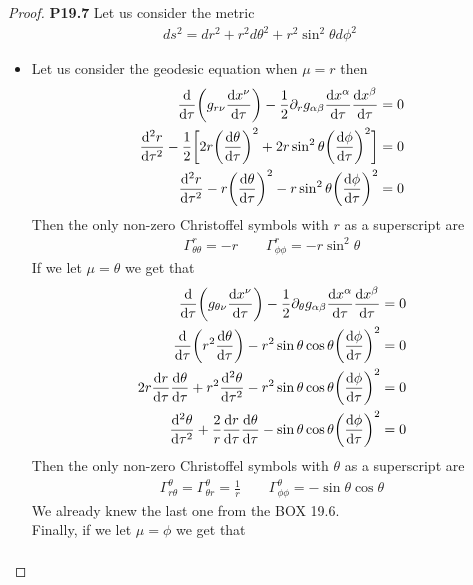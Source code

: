 \documentclass[11pt]{article}
\theoremstyle{definition}
\begin{document}
\cleardoublepage
\begin{proof}{\textbf{P19.7}}
Let us consider the metric
\begin{align*}
    ds^2 = dr^2 + r^2d\theta^2 + r^2\sin^2\theta d\phi^2
\end{align*}
\begin{itemize}
\item [\textbf{a.}] Let us consider the geodesic equation when $\mu = r$ then
\begin{align*}
    \dv{\tau}(g_{r\nu}\dv{x^{\nu}}{\tau})
    - \frac{1}{2}\partial_{r}g_{\alpha\beta}\dv{x^\alpha}{\tau}\dv{x^\beta}{\tau}
    &= 0\\
    \dv[2]{r}{\tau}
    - \frac{1}{2}\bigg[
        2r\bigg(\dv{\theta}{\tau}\bigg)^2
        + 2r\sin^2\theta\bigg(\dv{\phi}{\tau}\bigg)^2
    \bigg]
    &= 0\\
    \dv[2]{r}{\tau}
    - r\bigg(\dv{\theta}{\tau}\bigg)^2
    - r\sin^2\theta\bigg(\dv{\phi}{\tau}\bigg)^2
    &= 0
\end{align*}
Then the only non-zero Christoffel symbols with $r$ as a superscript are
\begin{align*}
    \Gamma^r_{\theta\theta} = -r
    \qquad
    \Gamma^r_{\phi\phi} = -r\sin^2\theta
\end{align*}
If we let $\mu = \theta$ we get that
\begin{align*}
    \dv{\tau}(g_{\theta\nu}\dv{x^{\nu}}{\tau})
    - \frac{1}{2}\partial_{\theta}
    g_{\alpha\beta}\dv{x^\alpha}{\tau}\dv{x^\beta}{\tau}
    &= 0\\
    \dv{\tau}(r^2\dv{\theta}{\tau})
    - r^2\sin\theta\cos\theta\bigg(\dv{\phi}{\tau}\bigg)^2
    &= 0\\
    2r\dv{r}{\tau}\dv{\theta}{\tau} + r^2\dv[2]{\theta}{\tau} 
    - r^2\sin\theta\cos\theta\bigg(\dv{\phi}{\tau}\bigg)^2
    &= 0\\
    \dv[2]{\theta}{\tau} + \frac{2}{r}\dv{r}{\tau}\dv{\theta}{\tau}
    - \sin\theta\cos\theta\bigg(\dv{\phi}{\tau}\bigg)^2
    &= 0
\end{align*}
Then the only non-zero Christoffel symbols with $\theta$ as a superscript are
\begin{align*}
    \Gamma^\theta_{r\theta} = \Gamma^\theta_{\theta r} = \frac{1}{r}
    \qquad
    \Gamma^\theta_{\phi\phi} = - \sin\theta\cos\theta
\end{align*}
We already knew the last one from the BOX 19.6.
\\
Finally, if we let $\mu = \phi$ we get that
\begin{align*}

\end{align*}
\end{itemize}
\end{proof}
\end{document}
